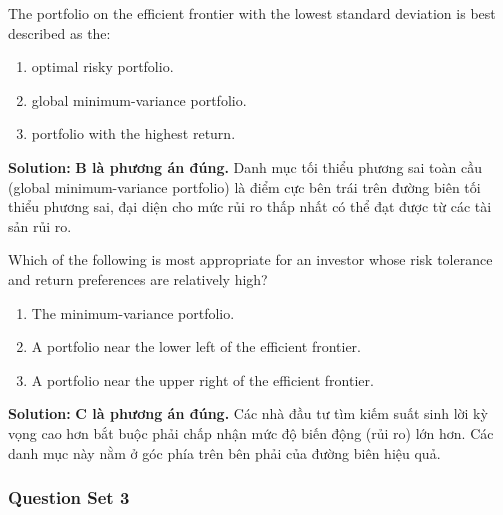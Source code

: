 \begin{tcolorbox}[
	colback=gray!5!white,
	colframe=black!15!white,
	boxrule=0.5pt,
	arc=3pt,
	title=\textbf{Question 3},
	coltitle=black,
	colbacktitle=black!5!white,
	before skip=6pt,
	after skip=6pt,
	breakable
]
The portfolio on the efficient frontier with the lowest standard deviation is best described as the:
\begin{enumerate}[label=\Alph*.]
	\item optimal risky portfolio.
	\item global minimum-variance portfolio.
	\item portfolio with the highest return.
\end{enumerate}

\textbf{Solution:}
\textbf{B là phương án đúng.} Danh mục tối thiểu phương sai toàn cầu (global minimum-variance portfolio) là điểm cực bên trái trên đường biên tối thiểu phương sai, đại diện cho mức rủi ro thấp nhất có thể đạt được từ các tài sản rủi ro.
\end{tcolorbox}

\begin{tcolorbox}[
	colback=gray!5!white,
	colframe=black!15!white,
	boxrule=0.5pt,
	arc=3pt,
	title=\textbf{Question 4},
	coltitle=black,
	colbacktitle=black!5!white,
	before skip=6pt,
	after skip=6pt,
	breakable
]
Which of the following is most appropriate for an investor whose risk tolerance and return preferences are relatively high?
\begin{enumerate}[label=\Alph*.]
	\item The minimum-variance portfolio.
	\item A portfolio near the lower left of the efficient frontier.
	\item A portfolio near the upper right of the efficient frontier.
\end{enumerate}

\textbf{Solution:}
\textbf{C là phương án đúng.} Các nhà đầu tư tìm kiếm suất sinh lời kỳ vọng cao hơn bắt buộc phải chấp nhận mức độ biến động (rủi ro) lớn hơn. Các danh mục này nằm ở góc phía trên bên phải của đường biên hiệu quả.
\end{tcolorbox}

\subsubsection{Question Set 3}
\label{subsec:app_Question Set 3}

